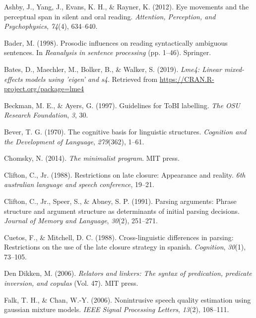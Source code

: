 \documentclass[12pt,oneside]{book}
\begin{document}
\hypertarget{refs}{}
\leavevmode\hypertarget{ref-ashby2012eye}{}%
Ashby, J., Yang, J., Evans, K. H., \& Rayner, K. (2012). Eye movements and the perceptual span in silent and oral reading. \emph{Attention, Perception, and Psychophysics}, \emph{74}(4), 634--640.

\leavevmode\hypertarget{ref-Bader1998-ts}{}%
Bader, M. (1998). Prosodic influences on reading syntactically ambiguous sentences. In \emph{Reanalysis in sentence processing} (pp. 1--46). Springer.

\leavevmode\hypertarget{ref-R-lme4}{}%
Bates, D., Maechler, M., Bolker, B., \& Walker, S. (2019). \emph{Lme4: Linear mixed-effects models using 'eigen' and s4}. Retrieved from \url{https://CRAN.R-project.org/package=lme4}

\leavevmode\hypertarget{ref-Beckman1997-eu}{}%
Beckman, M. E., \& Ayers, G. (1997). Guidelines for ToBI labelling. \emph{The OSU Research Foundation}, \emph{3}, 30.

\leavevmode\hypertarget{ref-bever1970}{}%
Bever, T. G. (1970). The cognitive basis for linguistic structures. \emph{Cognition and the Development of Language}, \emph{279}(362), 1--61.

\leavevmode\hypertarget{ref-chomsky2014minimalist}{}%
Chomsky, N. (2014). \emph{The minimalist program}. MIT press.

\leavevmode\hypertarget{ref-clifton1988restrictions}{}%
Clifton, C., Jr. (1988). Restrictions on late closure: Appearance and reality. \emph{6th australian language and speech conference}, 19--21.

\leavevmode\hypertarget{ref-cliftonEtAl1991}{}%
Clifton, C., Jr., Speer, S., \& Abney, S. P. (1991). Parsing arguments: Phrase structure and argument structure as determinants of initial parsing decisions. \emph{Journal of Memory and Language}, \emph{30}(2), 251--271.

\leavevmode\hypertarget{ref-Cuetos1988-tm}{}%
Cuetos, F., \& Mitchell, D. C. (1988). Cross-linguistic differences in parsing: Restrictions on the use of the late closure strategy in spanish. \emph{Cognition}, \emph{30}(1), 73--105.

\leavevmode\hypertarget{ref-den2006relators}{}%
Den Dikken, M. (2006). \emph{Relators and linkers: The syntax of predication, predicate inversion, and copulas} (Vol. 47). MIT press.

\leavevmode\hypertarget{ref-gmm1}{}%
Falk, T. H., \& Chan, W.-Y. (2006). Nonintrusive speech quality estimation using gaussian mixture models. \emph{IEEE Signal Processing Letters}, \emph{13}(2), 108--111.
\end{document}
